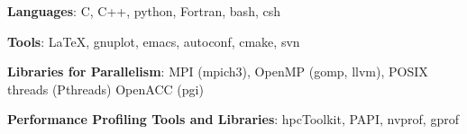 {{\bf Languages}: C, C++, python, Fortran, bash, csh}

{{\bf Tools}: LaTeX, gnuplot, emacs, autoconf, cmake, svn}

{{\bf Libraries for Parallelism}: MPI (mpich3), OpenMP (gomp, llvm), POSIX threads (Pthreads) OpenACC (pgi)}

{{\bf Performance Profiling Tools and Libraries}: hpcToolkit, PAPI, nvprof, gprof}
